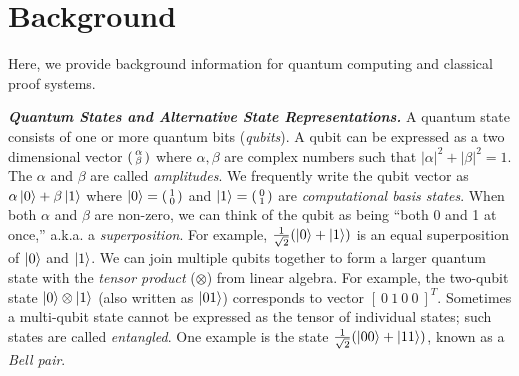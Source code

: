 \section{Background}
\label{sec:background}

Here, we provide background information for quantum computing and classical proof systems.

\noindent\textbf{\textit{Quantum States and Alternative State Representations.}} A quantum state consists of one or more quantum bits (\emph{qubits}). A qubit can be expressed as a two dimensional vector $\begin{psmallmatrix} \alpha \\ \beta \end{psmallmatrix}$ where $\alpha,\beta$ are complex numbers such that $|\alpha|^2 + |\beta|^2 = 1$.  The $\alpha$ and $\beta$ are called \emph{amplitudes}. 
%
We frequently write the qubit vector as $\alpha\left\vert{0}\right\rangle + \beta\left\vert{1}\right\rangle$ where $\left\vert{0}\right\rangle = \begin{psmallmatrix} 1 \\ 0 \end{psmallmatrix}$ and $\left\vert{1}\right\rangle = \begin{psmallmatrix} 0 \\ 1 \end{psmallmatrix}$ are \emph{computational basis states}. When both $\alpha$ and $\beta$ are non-zero, we can think of the qubit as being ``both 0 and 1 at once,'' a.k.a. a \emph{superposition}. For example, $\frac{1}{\sqrt{2}}(\left\vert{0}\right\rangle + \left\vert{1}\right\rangle)$ is an equal superposition of $\left\vert{0}\right\rangle$ and $\left\vert{1}\right\rangle$. 
We can join multiple qubits together to form a larger quantum state with the \emph{tensor product} ($\otimes$) from linear algebra. For example, the two-qubit state $\left\vert{0}\right\rangle \otimes \left\vert{1}\right\rangle$ (also written as $\left\vert{01}\right\rangle$) corresponds to vector $[~0~1~0~0~]^T$. 
Sometimes a multi-qubit state cannot be expressed as the tensor of individual states; such states are called \emph{entangled}. One example is the state $\frac{1}{\sqrt{2}}(\left\vert{00}\right\rangle + \left\vert{11}\right\rangle)$, known as a \emph{Bell pair}.

